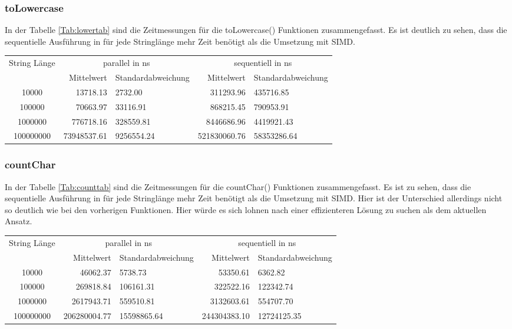 \documentclass[plainarticle,zihtitle,german,final,hyperref,utf8]{zihpub}
\begin{document}
\subsubsection{toLowercase}
In der Tabelle \ref{Tab:lowertab} sind die Zeitmessungen für die toLowercase() Funktionen zusammengefasst.
Es ist deutlich zu sehen, dass die sequentielle Ausführung in für jede Stringlänge mehr Zeit benötigt als die Umsetzung mit SIMD.
\newline
\begin{tabular}{|c|r|l|r|l|}
	\hline
	\multicolumn{1}{|c|}{String Länge} & \multicolumn{2}{c|}{parallel in ns} & \multicolumn{2}{c|}{sequentiell in ns} \\
	\cline{2-5}
	& Mittelwert & Standardabweichung  & Mittelwert & Standardabweichung \\
	\hline
	10000 & 13718.13 & 2732.00 & 311293.96 & 435716.85 \\
	100000 & 70663.97 & 33116.91 & 868215.45 & 790953.91 \\
	1000000 & 776718.16 & 328559.81 & 8446686.96 & 4419921.43 \\
	100000000 & 73948537.61 & 9256554.24 & 521830060.76 & 58353286.64 \\
	\hline
\end{tabular}
\label{Tab:lowertab}

\subsubsection{countChar}
In der Tabelle \ref{Tab:counttab} sind die Zeitmessungen für die countChar() Funktionen zusammengefasst.
Es ist zu sehen, dass die sequentielle Ausführung in für jede Stringlänge mehr Zeit benötigt als die Umsetzung mit SIMD. Hier ist der Unterschied allerdings nicht so deutlich wie bei den vorherigen Funktionen. Hier würde es sich lohnen nach einer effizienteren Lösung zu suchen als dem aktuellen Ansatz.
\newline
\begin{tabular}{|c|r|l|r|l|}
	\hline
	\multicolumn{1}{|c|}{String Länge} & \multicolumn{2}{c|}{parallel in ns} & \multicolumn{2}{c|}{sequentiell in ns} \\
	\cline{2-5}
	& Mittelwert & Standardabweichung  & Mittelwert & Standardabweichung \\
	\hline
	10000 & 46062.37 & 5738.73 & 53350.61 & 6362.82 \\
	100000 & 269818.84 & 106161.31 & 322522.16 & 122342.74 \\
	1000000 & 2617943.71 & 559510.81 & 3132603.61 & 554707.70 \\
	100000000 & 206280004.77 & 15598865.64 & 244304383.10 & 12724125.35 \\
	\hline
\end{tabular}
\label{Tab:counttab}
\end{document}
